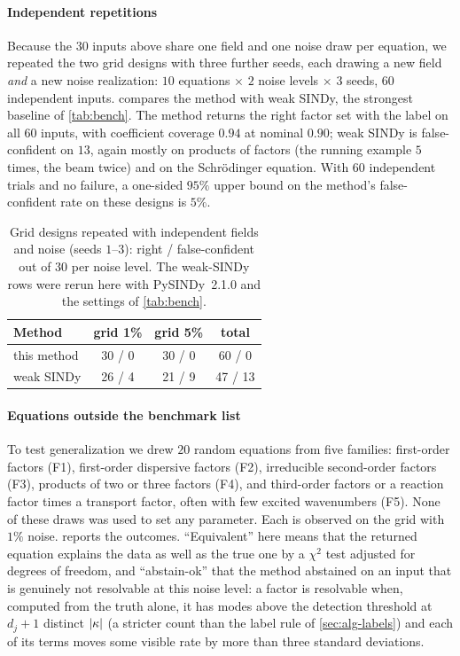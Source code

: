 \paragraph{Independent repetitions} Because the $30$ inputs above share one field and one noise draw per equation,
we repeated the two grid designs with three further seeds, each drawing a new field \emph{and} a new noise
realization: $10$ equations $\times$ $2$ noise levels $\times$ $3$ seeds, $60$ independent inputs. 
compares the method with weak SINDy, the strongest baseline of \cref{tab:bench}. The method returns the right factor
set with the label \FC{} on all $60$ inputs, with coefficient coverage $0.94$ at nominal $0.90$; weak SINDy is
false-confident on $13$, again mostly on products of factors (the running example $5$ times, the beam twice) and on the
Schr\"odinger equation. With $60$ independent trials and no failure, a one-sided $95\%$ upper bound on the method's
false-confident rate on these designs is $5\%$.

\begin{table}[tbp]
\centering\small
\caption{Grid designs repeated with independent fields and noise (seeds $1$--$3$): right / false-confident out of $30$
per noise level. The weak-SINDy rows were rerun here with PySINDy~2.1.0 and the settings of \cref{tab:bench}.}\label{tab:multiseed}
\begin{tabular}{@{}lccc@{}}
\toprule
Method & grid 1\% & grid 5\% & total\\
\midrule
this method & 30 / 0 & 30 / 0 & 60 / 0\\
weak SINDy  & 26 / 4 & 21 / 9 & 47 / 13\\
\bottomrule
\end{tabular}
\end{table}

\paragraph{Equations outside the benchmark list} To test generalization we drew $20$ random equations
from five families: first-order factors (F1), first-order dispersive factors (F2), irreducible
second-order factors (F3), products of two or three factors (F4), and third-order factors or a reaction
factor times a transport factor, often with few excited wavenumbers (F5). None of these draws was used to
set any parameter. Each is observed on the grid
with $1\%$ noise.  reports the outcomes. ``Equivalent'' here means that the returned
equation explains the data as well as the true one by a $\chi^2$ test adjusted for degrees of freedom, and
``abstain-ok'' that the method abstained on an input that is genuinely not resolvable at this noise level:
a factor is resolvable when, computed from the truth alone, it has modes above the detection threshold at
$d_j+1$ distinct $\lvert\kappa\rvert$ (a stricter count than the label rule of \cref{sec:alg-labels}) and each of its terms moves some visible rate by more than three standard deviations.

